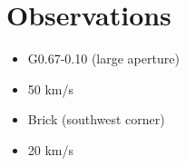\section{Observations}

\begin{itemize}
\item G0.67-0.10 (large aperture)
\item 50 km/s 
\item Brick (southwest corner)
\item 20 km/s
\end{itemize}


